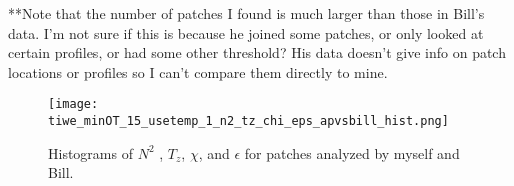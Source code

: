\documentclass[11pt]{article}
\begin{document}
**Note that the number of patches I found is much larger than those in Bill's data. I'm not sure if this is because he joined some patches, or only looked at certain profiles, or had some other threshold? His data doesn't give info on patch locations or profiles so I can't compare them directly to mine.

\begin{figure}[htbp]
\texttt{[image: tiwe\_minOT\_15\_usetemp\_1\_n2\_tz\_chi\_eps\_apvsbill\_hist.png]}
\caption{Histograms of $N^2$ , $T_z$, $\chi$, and $\epsilon$ for patches analyzed by myself and Bill.}
\label{comp_bill_ap_1}
\end{figure}
%




%
%
%
%
%
%
%
%
\end{document}
